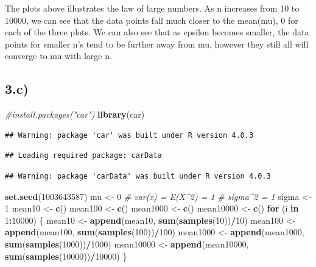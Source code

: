 \documentclass[
]{article}
\newenvironment{Shaded}{\begin{snugshade}}{\end{snugshade}}
\newcommand{\CommentTok}[1]{\textcolor[rgb]{0.56,0.35,0.01}{\textit{#1}}}
\newcommand{\ControlFlowTok}[1]{\textcolor[rgb]{0.13,0.29,0.53}{\textbf{#1}}}
\newcommand{\DecValTok}[1]{\textcolor[rgb]{0.00,0.00,0.81}{#1}}
\newcommand{\KeywordTok}[1]{\textcolor[rgb]{0.13,0.29,0.53}{\textbf{#1}}}
\newcommand{\NormalTok}[1]{#1}
\newcommand{\OperatorTok}[1]{\textcolor[rgb]{0.81,0.36,0.00}{\textbf{#1}}}
\newcommand{\StringTok}[1]{\textcolor[rgb]{0.31,0.60,0.02}{#1}}
\begin{document}
The plots above illustrates the law of large numbers. As n increases
from 10 to 10000, we can see that the data points fall much closer to
the mean(mu), 0 for each of the three plots. We can also see that as
epsilon becomes smaller, the data points for smaller n's tend to be
further away from mu, however they still all will converge to mu with
large n.

\hypertarget{c}{%
\subsection{3.c)}\label{c}}

\begin{Shaded}
\begin{Highlighting}[]
\CommentTok{#install.packages("car")}
\KeywordTok{library}\NormalTok{(car)}
\end{Highlighting}
\end{Shaded}

\begin{verbatim}
## Warning: package 'car' was built under R version 4.0.3
\end{verbatim}

\begin{verbatim}
## Loading required package: carData
\end{verbatim}

\begin{verbatim}
## Warning: package 'carData' was built under R version 4.0.3
\end{verbatim}

\begin{Shaded}
\begin{Highlighting}[]
\KeywordTok{set.seed}\NormalTok{(}\DecValTok{1003643587}\NormalTok{)}
\NormalTok{mu <-}\StringTok{ }\DecValTok{0}
\CommentTok{# var(x) = E(X^2) = 1}
\CommentTok{# sigma^2 = 1}
\NormalTok{sigma <-}\StringTok{ }\DecValTok{1}
\NormalTok{mean10 <-}\StringTok{ }\KeywordTok{c}\NormalTok{()}
\NormalTok{mean100 <-}\StringTok{ }\KeywordTok{c}\NormalTok{()}
\NormalTok{mean1000 <-}\StringTok{ }\KeywordTok{c}\NormalTok{()}
\NormalTok{mean10000 <-}\StringTok{ }\KeywordTok{c}\NormalTok{()}
\ControlFlowTok{for}\NormalTok{ (i }\ControlFlowTok{in} \DecValTok{1}\OperatorTok{:}\DecValTok{10000}\NormalTok{) \{}
\NormalTok{  mean10 <-}\StringTok{ }\KeywordTok{append}\NormalTok{(mean10, }\KeywordTok{sum}\NormalTok{(}\KeywordTok{samples}\NormalTok{(}\DecValTok{10}\NormalTok{))}\OperatorTok{/}\DecValTok{10}\NormalTok{)}
\NormalTok{  mean100 <-}\StringTok{ }\KeywordTok{append}\NormalTok{(mean100, }\KeywordTok{sum}\NormalTok{(}\KeywordTok{samples}\NormalTok{(}\DecValTok{100}\NormalTok{))}\OperatorTok{/}\DecValTok{100}\NormalTok{)}
\NormalTok{  mean1000 <-}\StringTok{ }\KeywordTok{append}\NormalTok{(mean1000, }\KeywordTok{sum}\NormalTok{(}\KeywordTok{samples}\NormalTok{(}\DecValTok{1000}\NormalTok{))}\OperatorTok{/}\DecValTok{1000}\NormalTok{)}
\NormalTok{  mean10000 <-}\StringTok{ }\KeywordTok{append}\NormalTok{(mean10000, }\KeywordTok{sum}\NormalTok{(}\KeywordTok{samples}\NormalTok{(}\DecValTok{10000}\NormalTok{))}\OperatorTok{/}\DecValTok{10000}\NormalTok{)}
\NormalTok{\}}
\end{Highlighting}
\end{Shaded}
\end{document}
